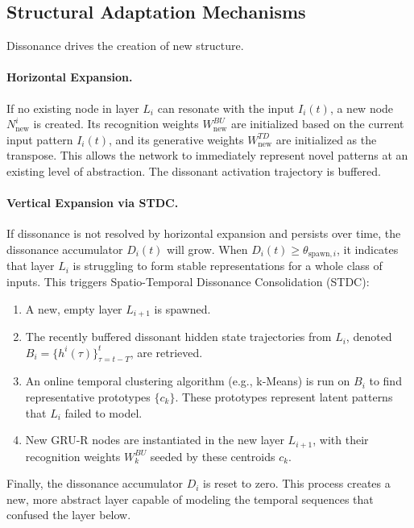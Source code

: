 \documentclass{article}
\begin{document}
\subsection{Structural Adaptation Mechanisms}
Dissonance drives the creation of new structure.

\paragraph{Horizontal Expansion.} If no existing node in layer $L_i$ can resonate with the input $I_i(t)$, a new node $N_{\text{new}}^i$ is created. Its recognition weights $W_{\text{new}}^{BU}$ are initialized based on the current input pattern $I_i(t)$, and its generative weights $W_{\text{new}}^{TD}$ are initialized as the transpose. This allows the network to immediately represent novel patterns at an existing level of abstraction. The dissonant activation trajectory is buffered.

\paragraph{Vertical Expansion via STDC.} If dissonance is not resolved by horizontal expansion and persists over time, the dissonance accumulator $D_i(t)$ will grow. When $D_i(t) \ge \theta_{\text{spawn},i}$, it indicates that layer $L_i$ is struggling to form stable representations for a whole class of inputs. This triggers Spatio-Temporal Dissonance Consolidation (STDC):
\begin{enumerate}
    \item A new, empty layer $L_{i+1}$ is spawned.
    \item The recently buffered dissonant hidden state trajectories from $L_i$, denoted $B_i = \{h^i(\tau)\}_{\tau=t-T}^{t}$, are retrieved.
    \item An online temporal clustering algorithm (e.g., k-Means) is run on $B_i$ to find representative prototypes $\{c_k\}$. These prototypes represent latent patterns that $L_i$ failed to model.
    \item New GRU-R nodes are instantiated in the new layer $L_{i+1}$, with their recognition weights $W_k^{BU}$ seeded by these centroids $c_k$.
\end{enumerate}
Finally, the dissonance accumulator $D_i$ is reset to zero. This process creates a new, more abstract layer capable of modeling the temporal sequences that confused the layer below.
\end{document}
